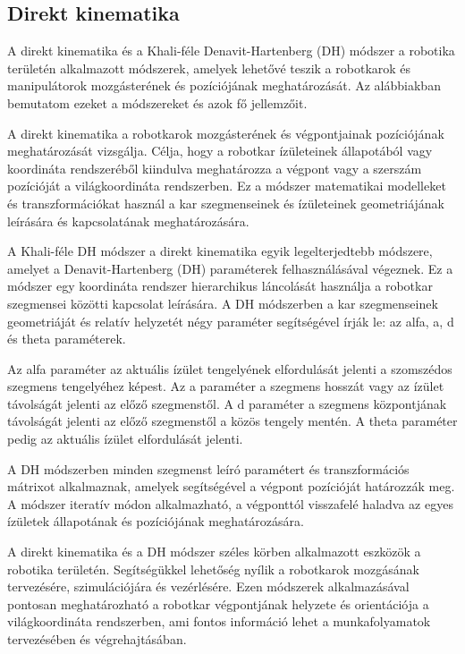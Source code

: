 \subsection{Direkt kinematika}
A direkt kinematika és a Khali-féle Denavit-Hartenberg (DH) módszer a robotika területén alkalmazott módszerek, amelyek lehetővé teszik a robotkarok és manipulátorok mozgásterének és pozíciójának meghatározását. Az alábbiakban bemutatom ezeket a módszereket és azok fő jellemzőit.

A direkt kinematika a robotkarok mozgásterének és végpontjainak pozíciójának meghatározását vizsgálja. Célja, hogy a robotkar ízületeinek állapotából vagy koordináta rendszeréből kiindulva meghatározza a végpont vagy a szerszám pozícióját a világkoordináta rendszerben. Ez a módszer matematikai modelleket és transzformációkat használ a kar szegmenseinek és ízületeinek geometriájának leírására és kapcsolatának meghatározására.

A Khali-féle DH módszer a direkt kinematika egyik legelterjedtebb módszere, amelyet a Denavit-Hartenberg (DH) paraméterek felhasználásával végeznek. Ez a módszer egy koordináta rendszer hierarchikus láncolását használja a robotkar szegmensei közötti kapcsolat leírására. A DH módszerben a kar szegmenseinek geometriáját és relatív helyzetét négy paraméter segítségével írják le: az alfa, a, d és theta paraméterek.

Az alfa paraméter az aktuális ízület tengelyének elfordulását jelenti a szomszédos szegmens tengelyéhez képest. Az a paraméter a szegmens hosszát vagy az ízület távolságát jelenti az előző szegmenstől. A d paraméter a szegmens központjának távolságát jelenti az előző szegmenstől a közös tengely mentén. A theta paraméter pedig az aktuális ízület elfordulását jelenti.

A DH módszerben minden szegmenst leíró paramétert és transzformációs mátrixot alkalmaznak, amelyek segítségével a végpont pozícióját határozzák meg. A módszer iteratív módon alkalmazható, a végponttól visszafelé haladva az egyes ízületek állapotának és pozíciójának meghatározására.

A direkt kinematika és a DH módszer széles körben alkalmazott eszközök a robotika területén. Segítségükkel lehetőség nyílik a robotkarok mozgásának tervezésére, szimulációjára és vezérlésére. Ezen módszerek alkalmazásával pontosan meghatározható a robotkar végpontjának helyzete és orientációja a világkoordináta rendszerben, ami fontos információ lehet a munkafolyamatok tervezésében és végrehajtásában.

